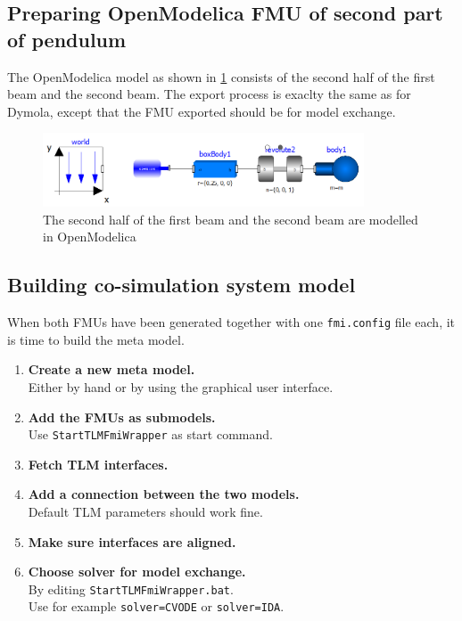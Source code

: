 \documentclass[11pt,a4paper,english]{report}
\begin{document}
\subsection{Preparing OpenModelica FMU of second part of pendulum}
\FloatBarrier
The OpenModelica model as shown in \cref{fig:model_omedit} consists of the second half of the first beam and the second beam.
The export process is exaclty the same as for Dymola, except that the FMU exported should be for model exchange.

\begin{figure}[ht]
\centering
\includegraphics[width=0.85\textwidth]{gfx/model_omedit.png}
\caption{The second half of the first beam and the second beam  are modelled in OpenModelica}
\label{fig:model_omedit}
\end{figure}

\FloatBarrier
\subsection{Building co-simulation system model}

When both FMUs have been generated together with one \texttt{fmi.config} file each, it is time to build the meta model.
\begin{enumerate}
\item \textbf{Create a new meta model.}\\
             Either by hand or by using the graphical user interface.
\item \textbf{Add the FMUs as submodels.}\\
              Use \texttt{StartTLMFmiWrapper} as start command.
\item \textbf{Fetch TLM interfaces.}
\item \textbf{Add a connection between the two models.}\\
              Default TLM parameters should work fine.
\item \textbf{Make sure interfaces are aligned.}
\item \textbf{Choose solver for model exchange.}\\
              By editing \texttt{StartTLMFmiWrapper.bat}.\\
              Use for example \texttt{solver=CVODE} or \texttt{solver=IDA}.
\end{enumerate}
\end{document}
